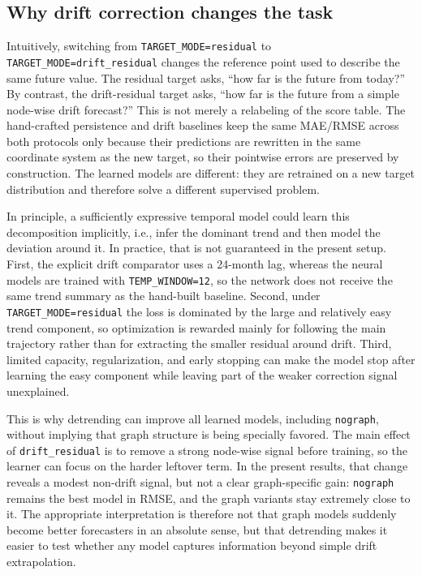 \documentclass{article}
\begin{document}
\subsection{Why drift correction changes the task}
Intuitively, switching from \texttt{TARGET\_MODE=residual} to \texttt{TARGET\_MODE=drift\_residual} changes the reference point used to describe the same future value. The residual target asks, ``how far is the future from today?'' By contrast, the drift-residual target asks, ``how far is the future from a simple node-wise drift forecast?'' This is not merely a relabeling of the score table. The hand-crafted persistence and drift baselines keep the same MAE/RMSE across both protocols only because their predictions are rewritten in the same coordinate system as the new target, so their pointwise errors are preserved by construction. The learned models are different: they are retrained on a new target distribution and therefore solve a different supervised problem.

In principle, a sufficiently expressive temporal model could learn this decomposition implicitly, i.e., infer the dominant trend and then model the deviation around it. In practice, that is not guaranteed in the present setup. First, the explicit drift comparator uses a 24-month lag, whereas the neural models are trained with \texttt{TEMP\_WINDOW=12}, so the network does not receive the same trend summary as the hand-built baseline. Second, under \texttt{TARGET\_MODE=residual} the loss is dominated by the large and relatively easy trend component, so optimization is rewarded mainly for following the main trajectory rather than for extracting the smaller residual around drift. Third, limited capacity, regularization, and early stopping can make the model stop after learning the easy component while leaving part of the weaker correction signal unexplained.

This is why detrending can improve all learned models, including \texttt{nograph}, without implying that graph structure is being specially favored. The main effect of \texttt{drift\_residual} is to remove a strong node-wise signal before training, so the learner can focus on the harder leftover term. In the present results, that change reveals a modest non-drift signal, but not a clear graph-specific gain: \texttt{nograph} remains the best model in RMSE, and the graph variants stay extremely close to it. The appropriate interpretation is therefore not that graph models suddenly become better forecasters in an absolute sense, but that detrending makes it easier to test whether any model captures information beyond simple drift extrapolation.
\end{document}

